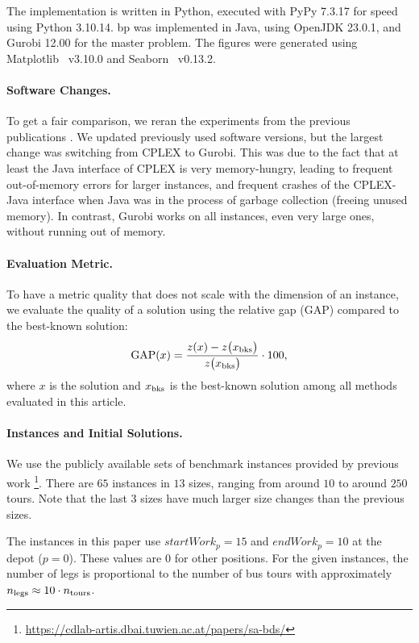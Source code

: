 \documentclass[]{amsart}
\newcommand{\GAP}{\text{GAP}}
\theoremstyle{plain}
\begin{document}
The implementation is written in Python, executed with PyPy 7.3.17 for speed using Python 3.10.14. \acrlong{bp} was implemented in Java, using OpenJDK 23.0.1, and Gurobi 12.00 for the master problem.  The figures were generated using Matplotlib~\cite{Hunter:2007} v3.10.0 and Seaborn~\cite{Waskom2021} v0.13.2.

\paragraph{Software Changes.}

To get a fair comparison, we reran the experiments from the previous publications \cite{kletzander2021branch,mazzoli2024investigating}. We updated previously used software versions, but the largest change was switching from CPLEX to Gurobi. This was due to the fact that at least the Java interface of CPLEX is very memory-hungry, leading to frequent out-of-memory errors for larger instances, and frequent crashes of the CPLEX-Java interface when Java was in the process of garbage collection (freeing unused memory). In contrast, Gurobi works on all instances, even very large ones, without running out of memory.

\paragraph{Evaluation Metric.}
To have a metric quality that does not scale with the dimension of an instance, we evaluate the quality of a solution using the relative gap ($\GAP$) compared to the best-known solution:
\begin{equation}
\GAP(x) = \frac{z(x)-z\bigl(x_\textup{bks}\bigr)}{z\bigl(x_\textup{bks}\bigr)}\cdot 100,
\end{equation}
where $x$ is the solution and $x_\textup{bks}$ is the best-known solution among all methods evaluated in this article.

\paragraph{Instances and Initial Solutions.}
We use the publicly available sets of benchmark instances provided by previous work \cite{kletzander2020solving,Kletzander2022}\footnote{\url{https://cdlab-artis.dbai.tuwien.ac.at/papers/sa-bds/}}. 
There are $65$ instances in $13$ sizes, ranging from around $10$ to around $250$ tours. Note that the last 3 sizes have much larger size changes than the previous sizes. 

The instances in this paper use $\mathit{startWork}_p=15$ and $\mathit{endWork}_p=10$ at the depot ($p=0$).
These values are $0$ for other positions. For the given instances, the number of legs is proportional to the number of bus tours with approximately $n_\textup{legs} \approx 10\cdot n_\textup{tours}$. 
\end{document}
